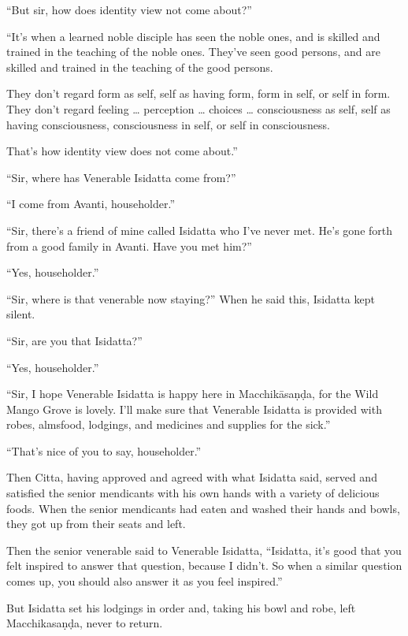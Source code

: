 \documentclass[12pt,openany]{book}%
\begin{document}
“But sir, how does identity view not come about?” 

“It’s when a learned noble disciple has seen the noble ones, and is skilled and trained in the teaching of the noble ones. They’ve seen good persons, and are skilled and trained in the teaching of the good persons. 

They don’t regard form as self, self as having form, form in self, or self in form. They don’t regard feeling … perception … choices … consciousness as self, self as having consciousness, consciousness in self, or self in consciousness. 

That’s how identity view does not come about.” 

“Sir, where has Venerable Isidatta come from?” 

“I come from Avanti, householder.” 

“Sir, there’s a friend of mine called Isidatta who I’ve never met. He’s gone forth from a good family in Avanti. Have you met him?” 

“Yes, householder.” 

“Sir, where is that venerable now staying?” When he said this, Isidatta kept silent. 

“Sir, are you that Isidatta?” 

“Yes, householder.” 

“Sir, I hope Venerable Isidatta is happy here in \textsanskrit{Macchikāsaṇḍa}, for the Wild Mango Grove is lovely. I’ll make sure that Venerable Isidatta is provided with robes, almsfood, lodgings, and medicines and supplies for the sick.” 

“That’s nice of you to say, householder.” 

Then Citta, having approved and agreed with what Isidatta said, served and satisfied the senior mendicants with his own hands with a variety of delicious foods. When the senior mendicants had eaten and washed their hands and bowls, they got up from their seats and left. 

Then the senior venerable said to Venerable Isidatta, “Isidatta, it’s good that you felt inspired to answer that question, because I didn’t. So when a similar question comes up, you should also answer it as you feel inspired.” 

But Isidatta set his lodgings in order and, taking his bowl and robe, left \textsanskrit{Macchikasaṇḍa}, never to return. 
\end{document}
